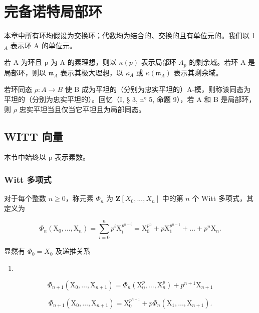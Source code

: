 \chapter{完备诺特局部环}

本章中所有环均假设为交换环；代数均为结合的、交换的且有单位元的。我们以 1 \(_{A}\) 表示环 A 的单位元。

若 A 为环且 p 为 A 的素理想，则以 \(\kappa(p)\) 表示局部环 \(A_p\) 的剩余域。若环 A 是局部环，则以 \(\mathfrak{m}_A\) 表示其极大理想，以 \(\kappa_A\) 或 \(\kappa(\mathfrak{m}_A)\) 表示其剩余域。

  若环同态 \(\rho: A \to B\) 使 B 成为平坦的（分别为忠实平坦的）A-模，则称该同态为平坦的（分别为忠实平坦的）。回忆（I, § 3, n° 5, 命题 9），若 A 和 B 是局部环，则 \(\rho\) 忠实平坦当且仅当它平坦且为局部同态。

\section{WITT 向量}

本节中始终以 p 表示素数。

\subsection{Witt 多项式}

  对于每个整数 \(n \geqslant 0\)，称元素 \(\Phi_n\) 为 \(\mathbf{Z}[X_0, ..., X_n]\) 中的第 \(n\) 个 Witt 多项式，其定义为

\[
\Phi_ {n} \left(\mathrm{X} _ {0}, \dots , \mathrm{X} _ {n}\right) = \sum_ {i = 0} ^ {n} p ^ {i} \mathrm{X} _ {i} ^ {p ^ {n - i}} = \mathrm{X} _ {0} ^ {p ^ {n}} + p \mathrm{X} _ {1} ^ {p ^ {n - 1}} + \dots + p ^ {n} \mathrm{X} _ {n}.\tag{1}
\]

显然有 \(\Phi_{0}=X_{0}\) 及递推关系

\begin{enumerate}
\def\labelenumi{(\arabic{enumi})}
\setcounter{enumi}{1}
\tightlist
\item
\end{enumerate}

\[
\Phi_ {n + 1} \left(\mathrm{X} _ {0}, \dots , \mathrm{X} _ {n + 1}\right) = \Phi_ {n} \left(\mathrm{X} _ {0} ^ {p}, \dots , \mathrm{X} _ {n} ^ {p}\right) + p ^ {n + 1} \mathrm{X} _ {n + 1}\tag{3}
\]

\[
\Phi_ {n + 1} \left(\mathrm{X} _ {0}, \dots , \mathrm{X} _ {n + 1}\right) = \mathrm{X} _ {0} ^ {p ^ {n + 1}} + p \Phi_ {n} \left(\mathrm{X} _ {1}, \dots , \mathrm{X} _ {n + 1}\right).
\]

